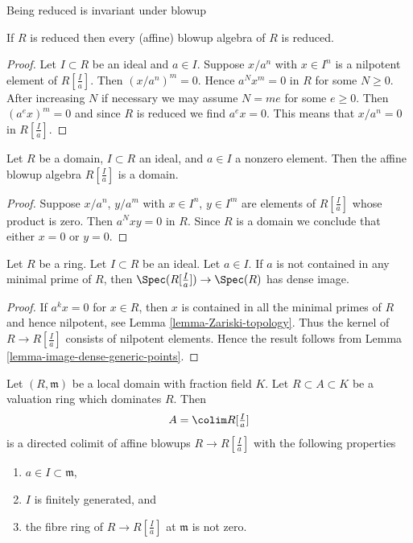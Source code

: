 \begin{lemma}
\label{lemma-blowup-reduced}
\begin{slogan}
Being reduced is invariant under blowup
\end{slogan}
If $R$ is reduced then every (affine) blowup algebra of $R$ is reduced.
\end{lemma}

\begin{proof}
Let $I \subset R$ be an ideal and $a \in I$. Suppose $x/a^n$ with
$x \in I^n$ is a nilpotent element of $R[\frac{I}{a}]$. Then
$(x/a^n)^m = 0$. Hence $a^N x^m = 0$ in $R$ for some $N \geq 0$.
After increasing $N$ if necessary we may assume $N = me$ for some
$e \geq 0$. Then $(a^e x)^m = 0$ and since $R$ is reduced we find
$a^e x = 0$. This means that $x/a^n = 0$ in $R[\frac{I}{a}]$.
\end{proof}

\begin{lemma}
\label{lemma-blowup-domain}
Let $R$ be a domain, $I \subset R$ an ideal, and $a \in I$ a nonzero
element. Then the affine blowup algebra $R[\frac{I}{a}]$ is a domain.
\end{lemma}

\begin{proof}
Suppose $x/a^n$, $y/a^m$ with $x \in I^n$, $y \in I^m$
are elements of $R[\frac{I}{a}]$ whose product is zero.
Then $a^N x y = 0$ in $R$. Since $R$ is a domain we conclude
that either $x = 0$ or $y = 0$.
\end{proof}

\begin{lemma}
\label{lemma-blowup-dominant}
Let $R$ be a ring. Let $I \subset R$ be an ideal. Let $a \in I$.
If $a$ is not contained in any minimal prime of $R$, then
$\Spec(R[\frac{I}{a}]) \to \Spec(R)$ has dense image.
\end{lemma}

\begin{proof}
If $a^k x = 0$ for $x \in R$, then $x$ is contained in all the
minimal primes of $R$ and hence nilpotent, see
Lemma \ref{lemma-Zariski-topology}.
Thus the kernel of $R \to R[\frac{I}{a}]$ consists of nilpotent
elements. Hence the result follows from
Lemma \ref{lemma-image-dense-generic-points}.
\end{proof}

\begin{lemma}
\label{lemma-valuation-ring-colimit-affine-blowups}
Let $(R, \mathfrak m)$ be a local domain with fraction field $K$.
Let $R \subset A \subset K$ be a valuation ring which dominates $R$.
Then
$$
A = \colim R[\textstyle{\frac{I}{a}}]
$$
is a directed colimit of affine blowups $R \to R[\frac{I}{a}]$ with
the following properties
\begin{enumerate}
\item $a \in I \subset \mathfrak m$,
\item $I$ is finitely generated, and
\item the fibre ring of $R \to R[\frac{I}{a}]$ at $\mathfrak m$
is not zero.
\end{enumerate}
\end{lemma}

